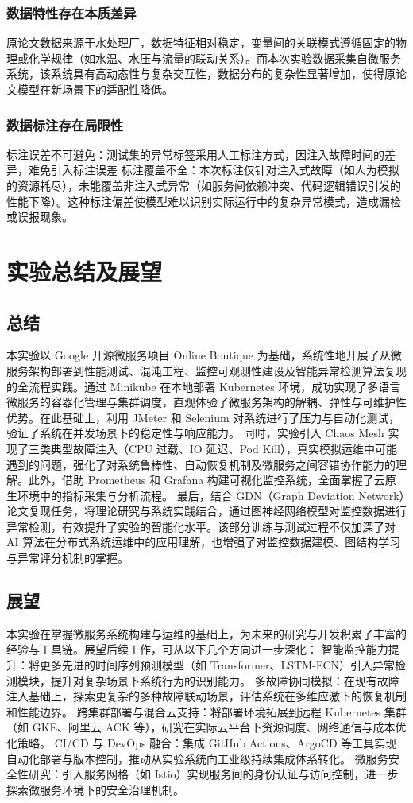 \documentclass[hyperref,a4paper,UTF8]{ctexart}
\begin{document}
\subsubsection{数据特性存在本质差异}
原论文数据来源于水处理厂，数据特征相对稳定，变量间的关联模式遵循固定的物理或化学规律（如水温、水压与流量的联动关系）。而本次实验数据采集自微服务系统，该系统具有高动态性与复杂交互性，数据分布的复杂性显著增加，使得原论文模型在新场景下的适配性降低。
\subsubsection{数据标注存在局限性}
标注误差不可避免：测试集的异常标签采用人工标注方式，因注入故障时间的差异，难免引入标注误差
标注覆盖不全：本次标注仅针对注入式故障（如人为模拟的资源耗尽），未能覆盖非注入式异常（如服务间依赖冲突、代码逻辑错误引发的性能下降）。这种标注偏差使模型难以识别实际运行中的复杂异常模式，造成漏检或误报现象。


\section{实验总结及展望}
\subsection{总结}
本实验以 Google 开源微服务项目 Online Boutique 为基础，系统性地开展了从微服务架构部署到性能测试、混沌工程、监控可观测性建设及智能异常检测算法复现的全流程实践。通过 Minikube 在本地部署 Kubernetes 环境，成功实现了多语言微服务的容器化管理与集群调度，直观体验了微服务架构的解耦、弹性与可维护性优势。在此基础上，利用 JMeter 和 Selenium 对系统进行了压力与自动化测试，验证了系统在并发场景下的稳定性与响应能力。
同时，实验引入 Chaos Mesh 实现了三类典型故障注入（CPU 过载、IO 延迟、Pod Kill），真实模拟运维中可能遇到的问题，强化了对系统鲁棒性、自动恢复机制及微服务之间容错协作能力的理解。此外，借助 Prometheus 和 Grafana 构建可视化监控系统，全面掌握了云原生环境中的指标采集与分析流程。
最后，结合 GDN（Graph Deviation Network）论文复现任务，将理论研究与系统实践结合，通过图神经网络模型对监控数据进行异常检测，有效提升了实验的智能化水平。该部分训练与测试过程不仅加深了对 AI 算法在分布式系统运维中的应用理解，也增强了对监控数据建模、图结构学习与异常评分机制的掌握。

\subsection{展望}
本实验在掌握微服务系统构建与运维的基础上，为未来的研究与开发积累了丰富的经验与工具链。展望后续工作，可从以下几个方向进一步深化：
智能监控能力提升：将更多先进的时间序列预测模型（如 Transformer、LSTM-FCN）引入异常检测模块，提升对复杂场景下系统行为的识别能力。
多故障协同模拟：在现有故障注入基础上，探索更复杂的多种故障联动场景，评估系统在多维应激下的恢复机制和性能边界。
跨集群部署与混合云支持：将部署环境拓展到远程 Kubernetes 集群（如 GKE、阿里云 ACK 等），研究在实际云平台下资源调度、网络通信与成本优化策略。
CI/CD 与 DevOps 融合：集成 GitHub Actions、ArgoCD 等工具实现自动化部署与版本控制，推动从实验系统向工业级持续集成体系转化。
微服务安全性研究：引入服务网格（如 Istio）实现服务间的身份认证与访问控制，进一步探索微服务环境下的安全治理机制。
\end{document}
